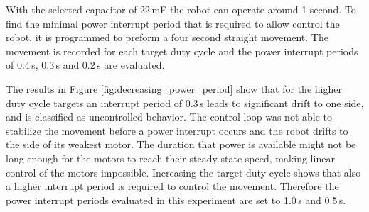 With the selected capacitor of 22\,mF the robot can operate around 1 second. 
To find the minimal power interrupt period that is required to allow control the robot, it is programmed to preform a four second straight movement.
The movement is recorded for each target duty cycle and the power interrupt periods of 0.4\,s, 0.3\,s and 0.2\,s are evaluated.

The results in Figure \ref{fig:decreasing_power_period} show that for the higher duty cycle targets an interrupt period of 0.3\,s leads to significant drift to one side, and is classified as uncontrolled behavior.
The control loop was not able to stabilize the movement before a power interrupt occurs and the robot drifts to the side of its weakest motor.
The duration that power is available might not be long enough for the motors to reach their steady state speed, making linear control of the motors impossible.
Increasing the target duty cycle shows that also a higher interrupt period is required to control the movement. 
Therefore the power interrupt periods evaluated in this experiment are set to 1.0\,s and 0.5\,s.


